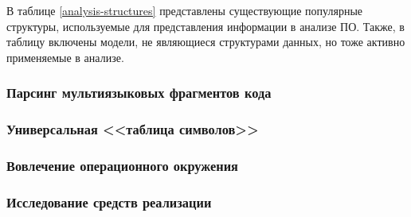 В таблице \ref{analysis-structures} представлены существующие популярные структуры, используемые
для представления информации в анализе ПО. Также, в таблицу включены модели, не являющиеся структурами
данных, но тоже активно применяемые в анализе.

\begin{table}[h]
    \caption{Структуры и модели представления информации в анализе ПО}
    \label{analysis-structures}
\end{table}




\subsubsection{Парсинг мультиязыковых фрагментов кода}


\subsubsection{Универсальная <<таблица символов>>}


\subsubsection{Вовлечение операционного окружения}


\subsubsection{Исследование средств реализации}



\clearpage
